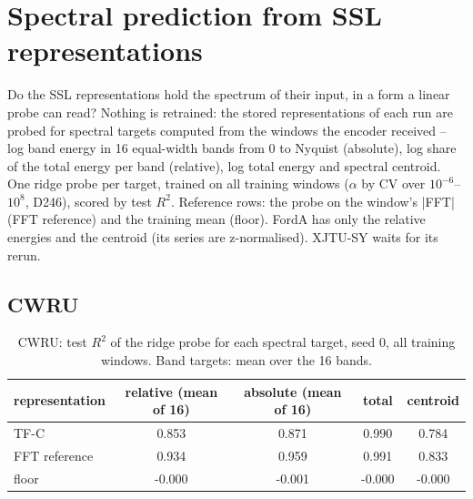\chapter{Spectral prediction from SSL representations}


Do the SSL representations hold the spectrum of their input, in a form a linear probe can read? Nothing is retrained: the stored representations of each run are probed for spectral targets computed from the windows the encoder received -- log band energy in 16 equal-width bands from 0 to Nyquist (absolute), log share of the total energy per band (relative), log total energy and spectral centroid. One ridge probe per target, trained on all training windows ($\alpha$ by CV over $10^{-6}$--$10^{8}$, D246), scored by test $R^2$. Reference rows: the probe on the window's |FFT| (FFT reference) and the training mean (floor). FordA has only the relative energies and the centroid (its series are z-normalised). XJTU-SY waits for its rerun.

\section{CWRU}
\begin{table}[ht]
\centering
\footnotesize
\begin{tabular}{lcccc}
\toprule
representation & relative (mean of 16) & absolute (mean of 16) & total & centroid \\
\midrule
TF-C & 0.853 & 0.871 & 0.990 & 0.784 \\
\midrule
FFT reference & 0.934 & 0.959 & 0.991 & 0.833 \\
floor & -0.000 & -0.001 & -0.000 & -0.000 \\
\bottomrule
\end{tabular}
\caption{CWRU: test $R^2$ of the ridge probe for each spectral target, seed 0, all training windows. Band targets: mean over the 16 bands.}
\end{table}

